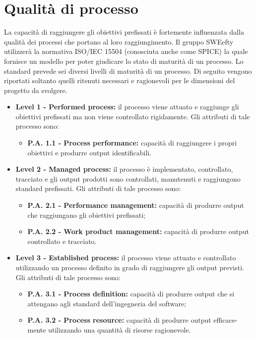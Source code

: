 \section{Qualità di processo}
La capacità di raggiungere gli obiettivi prefissati è fortemente influenzata dalla qualità dei processi che portano al loro raggiungimento. Il gruppo SWEefty utilizzerà la normativa ISO/IEC 15504 (conosciuta anche come SPICE) la quale fornisce un modello per poter giudicare lo stato di maturità di un processo.
Lo standard prevede sei diversi livelli di maturità di un processo. Di seguito vengono riportati soltanto quelli ritenuti necessari e ragionevoli per le dimensioni del progetto da svolgere.
\begin{itemize} 
	\item \textbf{Level 1 - Performed process:}
		il  processo  viene  attuato  e  raggiunge  gli
		obiettivi prefissati ma non viene controllato rigidamente.  Gli
		attributi di tale processo sono:
		\begin{itemize}
			\item \textbf{P.A. 1.1 - Process performance:}
			capacità  di  raggiungere  i  propri
			obiettivi e produrre output identificabili.
		\end{itemize}
	\item \textbf{Level 2 - Managed process:}
		il processo è implementato, controllato, tracciato e gli output prodotti sono controllati, manutenuti e raggiungono standard prefissati.  Gli attributi di tale processo sono:
		\begin{itemize}
			\item \textbf{P.A. 2.1 - Performance management:}
				capacità  di  produrre  output che raggiungano gli obiettivi prefissati;
			\item \textbf{P.A. 2.2 - Work product management:}
				capacità di produrre output controllato e tracciato.
		\end{itemize}
	\item \textbf{Level 3 - Established process:}
		il processo viene attuato e controllato utilizzando un processo definito in grado di raggiungere gli output previsti. Gli  attributi  di  tale processo sono:
		\begin{itemize}
			\item \textbf{P.A. 3.1 - Process definition:}
			capacità  di  produrre  output  che  si
			attengano agli standard dell’ingegneria del software;
			\item \textbf{P.A. 3.2 - Process resource:}
			capacità  di  produrre  output  efficace-
			mente utilizzando una quantità di risorse ragionevole.

\end{itemize}
\end{itemize}
